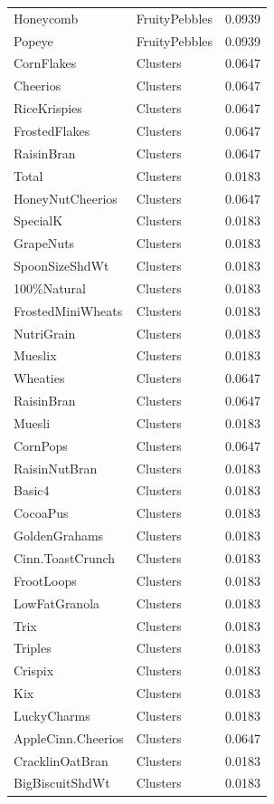 \begin{longtable}{llr}
Honeycomb & FruityPebbles & 0.0939 \\
Popeye & FruityPebbles & 0.0939 \\
CornFlakes & Clusters & 0.0647 \\
Cheerios & Clusters & 0.0647 \\
RiceKrispies & Clusters & 0.0647 \\
FrostedFlakes & Clusters & 0.0647 \\
RaisinBran & Clusters & 0.0647 \\
Total & Clusters & 0.0183 \\
HoneyNutCheerios & Clusters & 0.0647 \\
SpecialK & Clusters & 0.0183 \\
GrapeNuts & Clusters & 0.0183 \\
SpoonSizeShdWt & Clusters & 0.0183 \\
100\%Natural & Clusters & 0.0183 \\
FrostedMiniWheats & Clusters & 0.0183 \\
NutriGrain & Clusters & 0.0183 \\
Mueslix & Clusters & 0.0183 \\
Wheaties & Clusters & 0.0647 \\
RaisinBran & Clusters & 0.0647 \\
Muesli & Clusters & 0.0183 \\
CornPops & Clusters & 0.0647 \\
RaisinNutBran & Clusters & 0.0183 \\
Basic4 & Clusters & 0.0183 \\
CocoaPus & Clusters & 0.0183 \\
GoldenGrahams & Clusters & 0.0183 \\
Cinn.ToastCrunch & Clusters & 0.0183 \\
FrootLoops & Clusters & 0.0183 \\
LowFatGranola & Clusters & 0.0183 \\
Trix & Clusters & 0.0183 \\
Triples & Clusters & 0.0183 \\
Crispix & Clusters & 0.0183 \\
Kix & Clusters & 0.0183 \\
LuckyCharms & Clusters & 0.0183 \\
AppleCinn.Cheerios & Clusters & 0.0647 \\
CracklinOatBran & Clusters & 0.0183 \\
BigBiscuitShdWt & Clusters & 0.0183 \\

\end{longtable}
